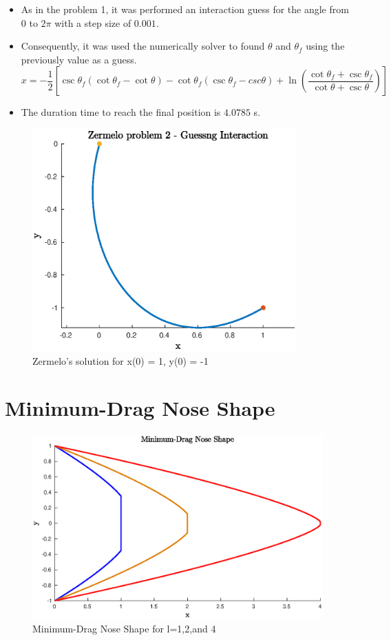 \documentclass{article}
\begin{document}
\begin{itemize}
\item As in the problem 1, it was performed an interaction guess for the angle from $0$ to $2\pi$ with a step size of $0.001$. 
\item Consequently, it was used the numerically solver to found $\theta$ and $\theta_f$ using the previously value as a guess.
\begin{equation*}
x = -\frac{1}{2}\left[\csc\theta_f(\cot\theta_f - \cot\theta) - \cot\theta_f(\csc\theta_f-csc\theta)+\ln\left(\frac{\cot\theta_f+\csc\theta_f}{\cot\theta+\csc\theta} \right) \right]
\end{equation*}
\item The duration time to reach the final position is $4.0785$ s.
\end{itemize}

\begin{figure}[H]
\centering
\includegraphics [width=4in]{f3}
\caption{Zermelo's solution for x(0) = 1, y(0) = -1}
\end{figure}

\section{Minimum-Drag Nose Shape}

\begin{figure}[H]
\centering
\includegraphics [width=4.4in]{f5}
\caption{Minimum-Drag Nose Shape for l=1,2,and 4}
\end{figure}
\end{document}
